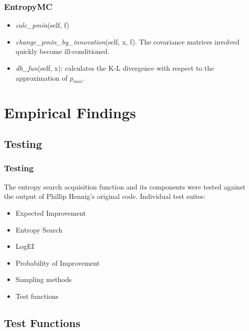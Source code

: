 \documentclass[10pt,handout]{beamer}
\begin{document}
\begin{frame}
\frametitle{EntropyMC}

\begin{itemize}
  \item \emph{calc\_pmin}(self, f)
  \item \emph{change\_pmin\_by\_innovation}(self, x, f). The covariance matrices
  involved quickly become ill-conditioned.
  \item \emph{dh\_fun}(self, x): calculates the K-L divergence with respect to
  the approximation of $p_{min}$.
\end{itemize}

\end{frame}


\section{Empirical Findings}

\subsection{Testing}
\begin{frame}
\frametitle{Testing}

The entropy search acquisition function and its components were tested
against the output of Phillip Hennig's original code. Individual test suites:

\begin{itemize}
  \item Expected Improvement
  \item Entropy Search
  \item LogEI
  \item Probability of Improvement
  \item Sampling methods
  \item Test functions
\end{itemize}
\end{frame}




\subsection{Test Functions}
\end{document}
